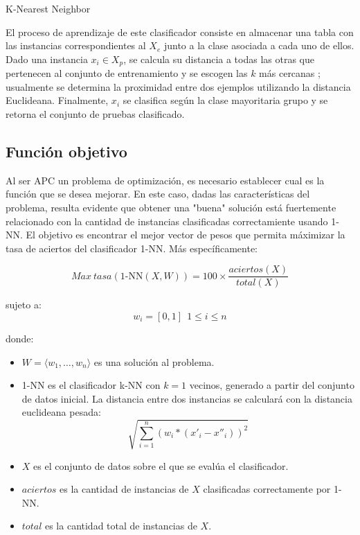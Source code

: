\documentclass{ci5652}
\begin{document}
\begin{algorithm}
 \DontPrintSemicolon
 \vspace*{0.1cm}
 \vspace*{0.1cm}
 \caption{K-Nearest Neighbor}
\end{algorithm}

El proceso de aprendizaje de este clasificador consiste en almacenar una tabla
con las instancias correspondientes al $X_e$ junto a la clase asociada a cada 
uno de ellos. Dado una instancia $x_i \in X_p$, se calcula su distancia a todas
las otras que pertenecen al conjunto de entrenamiento y se escogen las $k$ más
cercanas \cite{Herrera_2017}; usualmente se determina la proximidad entre dos
ejemplos utilizando la distancia Euclideana. Finalmente, $x_i$ se clasifica  
según la clase mayoritaria grupo y se retorna el conjunto de pruebas clasificado.


\subsection{Función objetivo}

Al ser APC un problema de optimización, es necesario establecer cual es la 
función que se desea mejorar. En este caso, dadas las características del
problema, resulta evidente que obtener una "buena" solución está fuertemente
relacionado con la cantidad de instancias clasificadas correctamiente usando
1-NN. El objetivo es encontrar el mejor vector de pesos que permita máximizar la
tasa de aciertos del clasificador 1-NN. Más específicamente:

\begin{equation}
  Max\ tasa(\text{1-NN}(X, W)) = 100 \times \frac{aciertos(X)}{total(X)}
\end{equation}

sujeto a:
\[
w_i = [0, 1] \ \ 1 \leq i \leq n
\]

donde:
\begin{itemize}
  \item $W = \langle w_1, \dots, w_n\rangle$ es una solución al problema.
  \item 1-NN es el clasificador k-NN con $k=1$ vecinos, generado a partir del
  conjunto de datos inicial. La distancia entre dos instancias se calculará 
  con la distancia euclideana pesada: 
  $$\sqrt{\sum_{i=1}^n (w_i * (x'_i - x''_i))^{2}}$$
  \item $X$ es el conjunto de datos sobre el que se evalúa el clasificador.
  \item $aciertos$ es la cantidad de instancias de $X$ clasificadas 
  correctamente por 1-NN.
  \item $total$ es la cantidad total de instancias de $X$.
\end{itemize}
\end{document}
